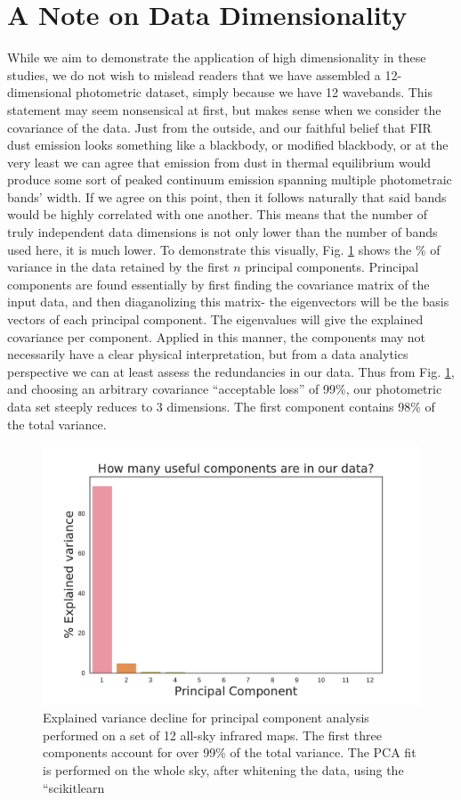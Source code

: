 \chapter*{A Note on Data Dimensionality}

While we aim to demonstrate the application of high dimensionality in these studies, we do not wish to mislead readers that we have assembled a 12-dimensional photometric dataset, simply because we have 12 wavebands. This statement may seem nonsensical at first, but makes sense when we consider the covariance of the data. Just from the outside, and our faithful belief that FIR dust emission looks something like a blackbody, or modified blackbody, or at the very least we can agree that emission from dust in thermal equilibrium would produce some sort of peaked continuum emission spanning multiple photometraic bands' width. If we agree on this point, then it follows naturally that said bands would be highly correlated with one another. This means that the number of truly independent data dimensions is not only lower than the number of bands used here, it is much lower. To demonstrate this visually, Fig. \hyperref[fig:pca_intro]{\ref{fig:pca_intro}} shows the \% of variance in the data retained by the first $n$ principal components. Principal components are found essentially by first finding the covariance matrix of the input data, and then diaganolizing this matrix- the eigenvectors will be the basis vectors of each principal component. The eigenvalues will give the explained covariance per component. Applied in this manner, the components may not necessarily have a clear physical interpretation, but from a data analytics perspective we can at least assess the redundancies in our data. Thus from Fig. \hyperref[fig:pca_intro]{\ref{fig:pca_intro}}, and choosing an arbitrary covariance ``acceptable loss'' of 99\%, our photometric data set steeply reduces to 3 dimensions. The first component contains 98\% of the total variance.


\begin{figure}
  \label{fig:pca_intro}
  \includegraphics[width=185mm]{../Plots/ch_intro/pca_intro.pdf}
  \centering
  \caption{Explained variance decline for principal component analysis performed on a set of 12 all-sky infrared maps. The first three components account for over 99\% of the total variance. The PCA fit is performed on the whole sky, after whitening the data, using the ``scikitlearn }
\end{figure}
